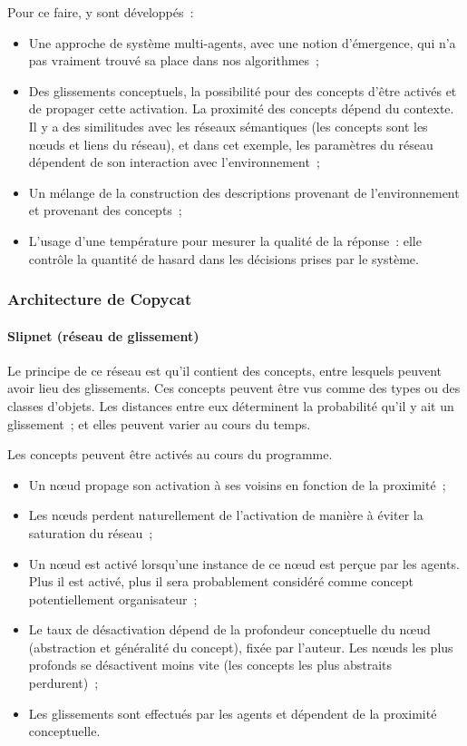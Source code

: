 \documentclass[a4paper, 12pt]{article}
\begin{document}
Pour ce faire, y sont développés~:

\begin{itemize}
 \item Une approche de système multi-agents, avec une notion d'émergence, qui n'a pas vraiment trouvé sa place dans nos algorithmes~;
 \item Des glissements conceptuels, la possibilité pour des concepts d'être activés et de propager cette activation. La proximité des concepts dépend du contexte. Il y a des similitudes avec les réseaux sémantiques (les concepts sont les n\oe{}uds et liens du réseau), et dans cet exemple, les paramètres du réseau dépendent de son interaction avec l'environnement~;
 \item Un mélange de la construction des descriptions provenant de l'environnement et provenant des concepts~;
 \item L'usage d'une température pour mesurer la qualité de la réponse~: elle contrôle la quantité de hasard dans les décisions prises par le système.
\end{itemize}

\subsubsection{Architecture de Copycat}

\paragraph{Slipnet (réseau de glissement)}
Le principe de ce réseau est qu'il contient des concepts, entre lesquels peuvent avoir lieu des glissements. Ces concepts peuvent être vus comme des types ou des classes d'objets. Les distances entre eux déterminent la probabilité qu'il y ait un glissement~; et elles peuvent varier au cours du temps.

Les concepts peuvent être activés au cours du programme.

\begin{itemize}
 \item Un n\oe{}ud propage son activation à ses voisins en fonction de la proximité~;
 \item Les n\oe{}uds perdent naturellement de l'activation de manière à éviter la saturation du réseau~;
 \item Un n\oe{}ud est activé lorsqu'une instance de ce n\oe{}ud est perçue par les agents. Plus il est activé, plus il sera probablement considéré comme concept potentiellement organisateur~;
 \item Le taux de désactivation dépend de la profondeur conceptuelle du n\oe{}ud (abstraction et généralité du concept), fixée par l'auteur. Les n\oe{}uds les plus profonds se désactivent moins vite (les concepts les plus abstraits perdurent)~;
 \item Les glissements sont effectués par les agents et dépendent de la proximité conceptuelle.
\end{itemize}
\end{document}
